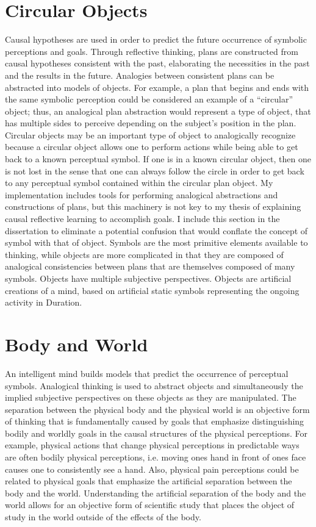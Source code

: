\section{Circular Objects}

Causal hypotheses are used in order to predict the future occurrence
of symbolic perceptions and goals.  Through reflective thinking, plans
are constructed from causal hypotheses consistent with the past,
elaborating the necessities in the past and the results in the future.
Analogies between consistent plans can be abstracted into models of
objects.  For example, a plan that begins and ends with the same
symbolic perception could be considered an example of a ``circular''
object; thus, an analogical plan abstraction would represent a type of
object, that has multiple sides to perceive depending on the subject's
position in the plan.  Circular objects may be an important type of
object to analogically recognize because a circular object allows one
to perform actions while being able to get back to a known perceptual
symbol.  If one is in a known circular object, then one is not lost in
the sense that one can always follow the circle in order to get back
to any perceptual symbol contained within the circular plan object.
My implementation includes tools for performing analogical
abstractions and constructions of plans, but this machinery is not key
to my thesis of explaining causal reflective learning to accomplish
goals.  I include this section in the dissertation to eliminate a
potential confusion that would conflate the concept of symbol with
that of object.  Symbols are the most primitive elements available to
thinking, while objects are more complicated in that they are composed
of analogical consistencies between plans that are themselves composed
of many symbols.  Objects have multiple subjective perspectives.
Objects are artificial creations of a mind, based on artificial static
symbols representing the ongoing activity in Duration.

\section{Body and World}

An intelligent mind builds models that predict the occurrence of
perceptual symbols.  Analogical thinking is used to abstract objects
and simultaneously the implied subjective perspectives on these
objects as they are manipulated.  The separation between the physical
body and the physical world is an objective form of thinking that is
fundamentally caused by goals that emphasize distinguishing bodily and
worldly goals in the causal structures of the physical perceptions.
For example, physical actions that change physical perceptions in
predictable ways are often bodily physical perceptions, i.e. moving
ones hand in front of ones face causes one to consistently see a hand.
Also, physical pain perceptions could be related to physical goals
that emphasize the artificial separation between the body and the
world.  Understanding the artificial separation of the body and the
world allows for an objective form of scientific study that places the
object of study in the world outside of the effects of the body.

